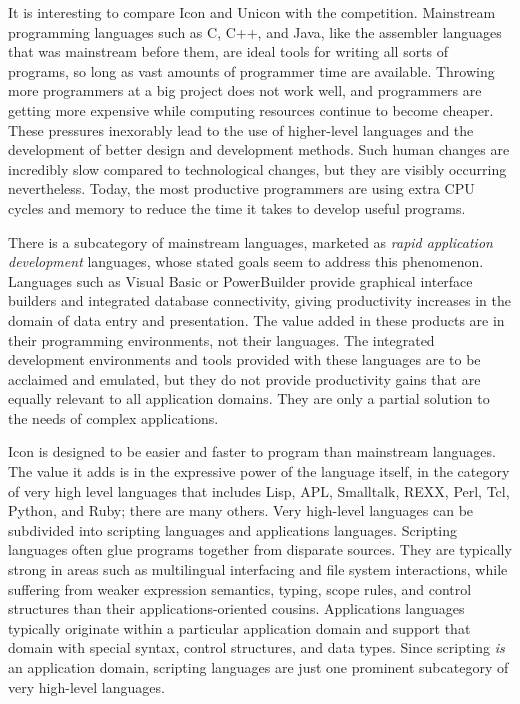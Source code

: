 It is interesting to compare Icon and Unicon with the competition.
Mainstream programming languages
such as C, C++, and Java, like the assembler languages that
was mainstream before them, are ideal tools
for writing all sorts of programs, so long as vast amounts of
programmer time are available. Throwing more programmers at a big
project does not work well, and programmers are getting more expensive
while computing
resources continue to become cheaper. These pressures
inexorably lead to the use of higher-level languages and the
development of better design and development methods. Such human
changes are incredibly slow compared to technological changes, but they
are visibly occurring nevertheless. Today, the most
productive programmers are using extra CPU cycles and memory
to reduce the time it takes to develop useful programs.

There is a subcategory of mainstream languages, marketed as \textit{rapid application development}
languages, whose stated goals seem to address this phenomenon.
Languages such as Visual Basic or
PowerBuilder provide
graphical interface builders and integrated database connectivity,
giving productivity increases in the domain of data entry and
presentation. The value added in these products are in their
programming environments, not their languages. The integrated development environments and tools
provided with these languages are to be acclaimed and emulated, but
they do not provide productivity gains that are equally relevant to all
application domains. They are only a partial solution to the needs of
complex applications.

Icon is designed to be easier and faster to program than mainstream
languages. The value it adds is in the expressive power of the language
itself, in the category of very high level languages
that includes Lisp,
APL, Smalltalk, REXX,
Perl, Tcl, Python, and
Ruby; there are
many others. Very high-level languages can be subdivided into
scripting languages and applications
languages. Scripting languages often glue programs
together from disparate sources. They are typically strong in areas
such as multilingual interfacing and file system interactions, while
suffering from weaker expression semantics, typing, scope rules, and
control structures than their applications-oriented cousins.
Applications languages typically originate within a particular
application domain and support that domain with special syntax, control
structures, and data types. Since scripting \textit{is} an application
domain, scripting languages are just one prominent
subcategory of very high-level languages.

